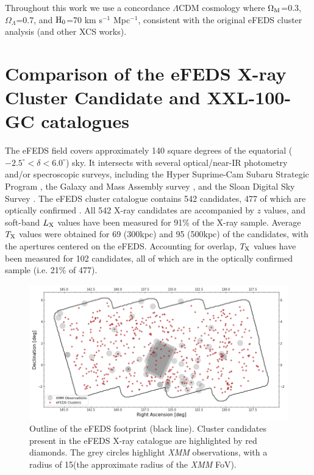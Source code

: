 \documentclass[fleqn,usenatbib]{mnras}
\begin{document}
Throughout this work we use a concordance $\Lambda$CDM cosmology where $\Omega_{\rm{M}}$=0.3, $\Omega_{\Lambda}$=0.7, and $\rm{H}_{0}$=70 km s$^{-1}$ Mpc$^{-1}$, consistent with the original eFEDS cluster analysis (and other XCS works).

\section{Comparison of the \lowercase{e}FEDS X-ray Cluster Candidate and XXL-100-GC catalogues}
\label{sec:efedsproperties}

The eFEDS field covers approximately 140 square degrees of the equatorial ($-2.5^{\circ}<\delta<6.0^{\circ}$) sky. It intersects with several optical/near-IR photometry and/or specroscopic surveys, including the Hyper Suprime-Cam Subaru Strategic Program \citep[HSC SSP, ][]{hscsurvey}, the Galaxy and Mass Assembly survey \citep[GAMA, ][]{gamasurvey}, and the Sloan Digital Sky Survey \citep[SDSS, ][]{sdss}. The eFEDS cluster catalogue \citep{efedsclustercat} contains 542 candidates, 477 of which are optically confirmed \citep{efedsclusteropticalcat}. All 542 X-ray candidates are accompanied by $z$ values, and soft-band $L_{\rm X}$ values have been measured for 91\% of the X-ray sample. Average $T_{\rm X}$ values were obtained for 69 (300kpc) and 95 (500kpc) of the candidates, with the apertures centered on the eFEDS. Accounting for overlap, $T_{\rm X}$ values have been measured for 102 candidates, all of which are in the optically confirmed sample (i.e. 21\% of 477).

\begin{figure}
    \centering
    \includegraphics[width=1.0\textwidth]{images/outline_withborder.png}
    \caption[]{Outline of the eFEDS footprint (black line). Cluster candidates present in the eFEDS X-ray catalogue are highlighted by red diamonds. The grey circles highlight {\em XMM} observations, with a radius of 15\arcmin (the approximate radius of the {\em XMM} FoV).}
    \label{fig:efedsxcsclusters}
\end{figure}
\end{document}
